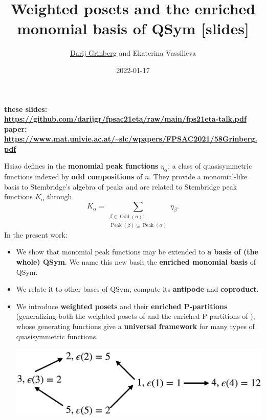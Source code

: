 \documentclass[numbers=enddot,12pt,final,onecolumn,notitlepage]{scrartcl}%
\newcommand{\al}{\alpha}
\newcommand{\Odd}{\operatorname{Odd}}
\newcommand{\Peak}{\operatorname{Peak}}
\newcommand{\0}{\phantom{c}}
\let\sumnonlimits\sum
\renewcommand{\sum}{\sumnonlimits\limits}
\begin{document}
\title{Weighted posets and the enriched monomial basis of QSym [slides]}
\author{\href{http://www.cip.ifi.lmu.de/~grinberg/}{Darij Grinberg} and Ekaterina Vassilieva}
\date{2022-01-17}
\maketitle

\noindent \textbf{these slides: \color{red}
\url{https://github.com/darijgr/fpsac21eta/raw/main/fps21eta-talk.pdf}}%
\newline\textbf{paper: \color{red}
\url{https://www.mat.univie.ac.at/~slc/wpapers/FPSAC2021/58Grinberg.pdf}}%
\newline

\begin{tcolorbox}[colback=cyan!5,colframe=cyan!75!black, fonttitle=\bfseries,title=Summary of our work] Hsiao defines in \cite{Hsi07} the \textbf{monomial peak functions} $\eta_{\al}$: a class of quasisymmetric functions indexed by \textbf{odd compositions} of $n$. They provide a monomial-like basis to Stembridge's algebra of peaks \cite{Ste97} and are related to Stembridge peak functions $K_\al$ through
\begin{equation*}
K_{\al} = \sum_{{\substack{\beta \in \Odd(n);\\ \Peak(\beta) \subseteq \Peak(\al)}}} \eta_{\beta}.
\end{equation*}
In the present work: 
\begin{itemize}
\item We show that monomial peak functions may be extended to \textbf{a basis of (the whole) QSym}. We name this new basis the \textbf{enriched monomial basis} of QSym.
\item We relate it to other bases of QSym, compute its \textbf{antipode} and \textbf{coproduct}. 
\item We introduce \textbf{weighted posets} and their \textbf{enriched P-partitions} (generalizing both the weighted posets of 
\cite{Gri17} and the enriched P-partitions of \cite{Ste97}), whose generating functions give a \textbf{universal framework} for many types of quasisymmetric functions.

\begin{center}
\includegraphics[scale=0.16]{Poset.png}
\end{center}
 

\end{itemize}
\end{tcolorbox}
\end{document}
